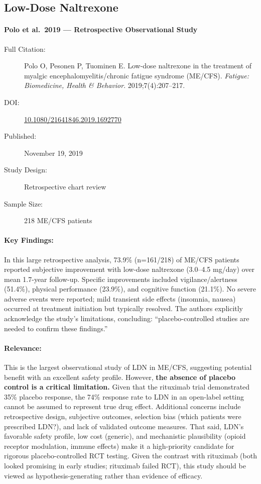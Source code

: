 \subsection{Low-Dose Naltrexone}

\paragraph{Polo et al.\ 2019 --- Retrospective Observational Study}

\begin{description}
    \item[Full Citation:] Polo O, Pesonen P, Tuominen E. Low-dose naltrexone in the treatment of myalgic encephalomyelitis/chronic fatigue syndrome (ME/CFS). \textit{Fatigue: Biomedicine, Health \& Behavior}. 2019;7(4):207--217.
    \item[DOI:] \href{https://doi.org/10.1080/21641846.2019.1692770}{10.1080/21641846.2019.1692770}
    \item[Published:] November 19, 2019
    \item[Study Design:] Retrospective chart review
    \item[Sample Size:] 218 ME/CFS patients
\end{description}

\paragraph{Key Findings:}
In this large retrospective analysis, 73.9\% (n=161/218) of ME/CFS patients reported subjective improvement with low-dose naltrexone (3.0--4.5 mg/day) over mean 1.7-year follow-up. Specific improvements included vigilance/alertness (51.4\%), physical performance (23.9\%), and cognitive function (21.1\%). No severe adverse events were reported; mild transient side effects (insomnia, nausea) occurred at treatment initiation but typically resolved. The authors explicitly acknowledge the study's limitations, concluding: ``placebo-controlled studies are needed to confirm these findings.''

\paragraph{Relevance:}
This is the largest observational study of LDN in ME/CFS, suggesting potential benefit with an excellent safety profile. However, \textbf{the absence of placebo control is a critical limitation.} Given that the rituximab trial demonstrated 35\% placebo response, the 74\% response rate to LDN in an open-label setting cannot be assumed to represent true drug effect. Additional concerns include retrospective design, subjective outcomes, selection bias (which patients were prescribed LDN?), and lack of validated outcome measures. That said, LDN's favorable safety profile, low cost (generic), and mechanistic plausibility (opioid receptor modulation, immune effects) make it a high-priority candidate for rigorous placebo-controlled RCT testing. Given the contrast with rituximab (both looked promising in early studies; rituximab failed RCT), this study should be viewed as hypothesis-generating rather than evidence of efficacy.

